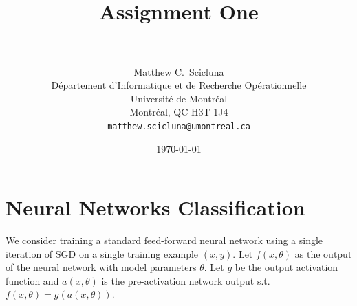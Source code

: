 \documentclass[paper=a4, fontsize=11pt]{scrartcl} %
\title{	
\normalfont \normalsize 
\horrule{0.5pt} \\[0.4cm] %
\huge Assignment One \\ %
\horrule{2pt} \\[0.5cm] %
}
\author{
	Matthew C.~Scicluna\\
	D\'epartement d'Informatique et de Recherche Op\'erationnelle\\
	Universit\'e de Montr\'eal\\
	Montr\'eal, QC H3T 1J4 \\
	\texttt{matthew.scicluna@umontreal.ca}
}
\date{\normalsize\today} %
\numberwithin{equation}{section} %
\numberwithin{figure}{section} %
\numberwithin{table}{section} %
\begin{document}
\maketitle %


\section{Neural Networks Classification}
We consider training a standard feed-forward neural network using a single iteration of SGD on a single training example $(x, y)$. Let
$f(x,\theta)$ as the output of the neural network with model parameters $\theta$. Let $g$ be the output activation function and $a(x, \theta)$ is the pre-activation network output s.t. $f(x, \theta) = g(a(x, \theta))$. 
\end{document}
